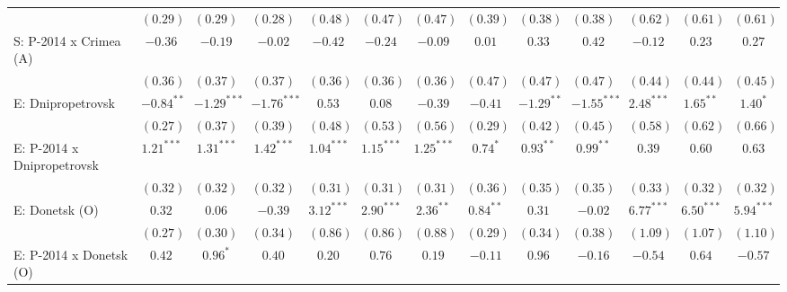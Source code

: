 \begin{table}
\begin{center}
\begin{tiny}
\begin{tabular}{l c c c c c c c c c c c c}
                            & $(0.29)$      & $(0.29)$      & $(0.28)$       & $(0.48)$      & $(0.47)$      & $(0.47)$      & $(0.39)$      & $(0.38)$       & $(0.38)$       & $(0.62)$       & $(0.61)$       & $(0.61)$       \\
S: P-2014 x Crimea (A)      & $-0.36$       & $-0.19$       & $-0.02$        & $-0.42$       & $-0.24$       & $-0.09$       & $0.01$        & $0.33$         & $0.42$         & $-0.12$        & $0.23$         & $0.27$         \\
                            & $(0.36)$      & $(0.37)$      & $(0.37)$       & $(0.36)$      & $(0.36)$      & $(0.36)$      & $(0.47)$      & $(0.47)$       & $(0.47)$       & $(0.44)$       & $(0.44)$       & $(0.45)$       \\
E: Dnipropetrovsk           & $-0.84^{**}$  & $-1.29^{***}$ & $-1.76^{***}$  & $0.53$        & $0.08$        & $-0.39$       & $-0.41$       & $-1.29^{**}$   & $-1.55^{***}$  & $2.48^{***}$   & $1.65^{**}$    & $1.40^{*}$     \\
                            & $(0.27)$      & $(0.37)$      & $(0.39)$       & $(0.48)$      & $(0.53)$      & $(0.56)$      & $(0.29)$      & $(0.42)$       & $(0.45)$       & $(0.58)$       & $(0.62)$       & $(0.66)$       \\
E: P-2014 x Dnipropetrovsk  & $1.21^{***}$  & $1.31^{***}$  & $1.42^{***}$   & $1.04^{***}$  & $1.15^{***}$  & $1.25^{***}$  & $0.74^{*}$    & $0.93^{**}$    & $0.99^{**}$    & $0.39$         & $0.60$         & $0.63$         \\
                            & $(0.32)$      & $(0.32)$      & $(0.32)$       & $(0.31)$      & $(0.31)$      & $(0.31)$      & $(0.36)$      & $(0.35)$       & $(0.35)$       & $(0.33)$       & $(0.32)$       & $(0.32)$       \\
E: Donetsk (O)              & $0.32$        & $0.06$        & $-0.39$        & $3.12^{***}$  & $2.90^{***}$  & $2.36^{**}$   & $0.84^{**}$   & $0.31$         & $-0.02$        & $6.77^{***}$   & $6.50^{***}$   & $5.94^{***}$   \\
                            & $(0.27)$      & $(0.30)$      & $(0.34)$       & $(0.86)$      & $(0.86)$      & $(0.88)$      & $(0.29)$      & $(0.34)$       & $(0.38)$       & $(1.09)$       & $(1.07)$       & $(1.10)$       \\
E: P-2014 x Donetsk (O)     & $0.42$        & $0.96^{*}$    & $0.40$         & $0.20$        & $0.76$        & $0.19$        & $-0.11$       & $0.96$         & $-0.16$        & $-0.54$        & $0.64$         & $-0.57$        \\

\end{tabular}
\end{tiny}
\end{center}
\end{table}
